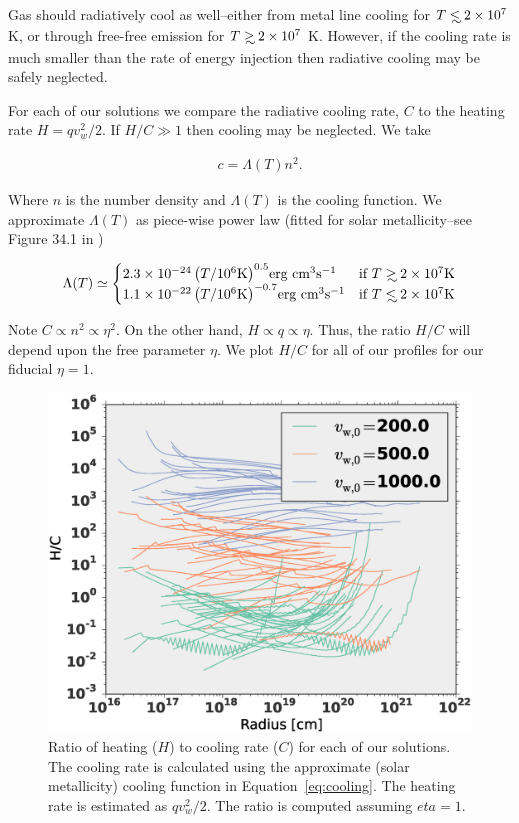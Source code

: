 \documentclass[usenatbib,fleqn]{mn2e}
\newcommand\lsim{\mathrel{\rlap{\lower4pt\hbox{\hskip1pt$\sim$}}
        \raise1pt\hbox{$<$}}}
\newcommand\gsim{\mathrel{\rlap{\lower4pt\hbox{\hskip1pt$\sim$}}
        \raise1pt\hbox{$>$}}}
\newcommand{\vw}{v_w}
\begin{document}
Gas should radiatively cool as well--either from metal line cooling
for $T\lsim 2\times 10^7$ K, or through free-free emission for $T\gsim
2\times 10^7$ K.  However, if the cooling rate is much smaller than
the rate of energy injection then radiative cooling may be safely
neglected.

For each of our solutions we compare the radiative cooling rate, $C$
to the heating rate $H=q \vw^2/2$. If $H/C \gg 1$ then cooling may be
neglected. We take

\begin{align}
c=\Lambda(T) n^2.
\end{align}

Where $n$ is the number density and $\Lambda(T)$ is the cooling
function. We approximate $\Lambda(T)$ as piece-wise power law (fitted
for solar metallicity--see Figure 34.1 in \cite{Draine:2011a})

\[
\Lambda(T)\simeq
\begin{cases}
    2.3 \times 10^{-24} \left(T/10^6 \text{K}\right)^{0.5} $erg cm$^3 $s$^{-1}& \text{if } T \gsim 2 \times 10^7 \text{K} \\
    1.1 \times 10^{-22} \left(T/10^6 \text{K}\right)^{-0.7}  $erg cm$^3 $s$^{-1}& \text{if } T \lsim 2 \times 10^7 \text{K}     
\end{cases}
\label{eq:cooling}
\]

Note $C\propto n^2\propto \eta^2$. On the other hand, $H \propto q
\propto \eta$. Thus, the ratio $H/C$ will depend upon the free
parameter $\eta$. We plot $H/C$ for all of our profiles for our
fiducial $\eta=1$.

\begin{figure}
\includegraphics[width=\columnwidth]{cooling.eps}
\caption{\label{fig:cooling} Ratio of heating ($H$) to cooling rate ($C$) for each of our solutions. The cooling rate is calculated using the approximate (solar metallicity) cooling function in Equation~\ref{eq:cooling}. The heating rate is estimated as $q \vw^2/2$. The ratio is computed assuming $eta=1$.}
\end{figure}
\end{document}
